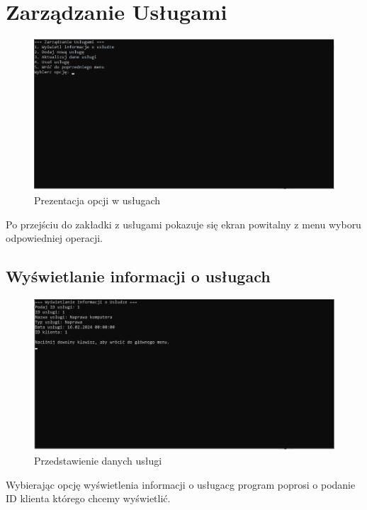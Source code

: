 \section{Zarządzanie Usługami}

\begin{figure}[h]
    \centering
    \includegraphics[width=\textwidth]{ZarzadUslug.png}
      \caption{Prezentacja opcji w usługach}
    \label{fig:example}
\end{figure}
Po przejściu do zakładki z usługami pokazuje się ekran powitalny z menu wyboru odpowiedniej operacji. 

\subsection{Wyświetlanie informacji o usługach}

\begin{figure}[h]
    \centering
    \includegraphics[width=\textwidth]{WysInfUslug.png}
      \caption{Przedstawienie danych usługi}
    \label{fig:example}
\end{figure}

Wybierając opcję wyświetlenia informacji o usługacg program poprosi o podanie ID klienta którego chcemy wyświetlić.


